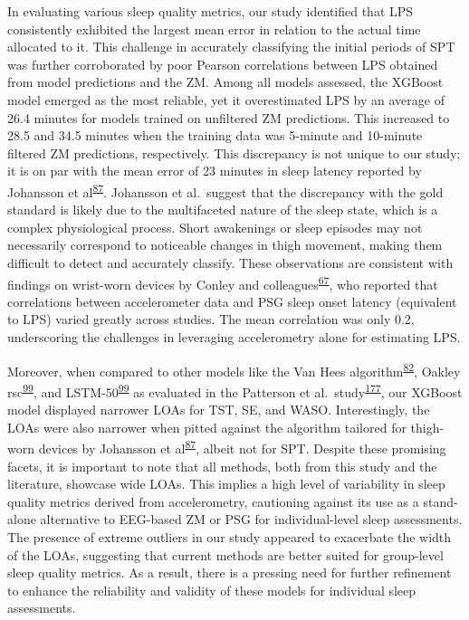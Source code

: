 \documentclass[
  10pt,
]{scrbook}
\begin{document}
In evaluating various sleep quality metrics, our study identified that
LPS consistently exhibited the largest mean error in relation to the
actual time allocated to it. This challenge in accurately classifying
the initial periods of SPT was further corroborated by poor Pearson
correlations between LPS obtained from model predictions and the ZM.
Among all models assessed, the XGBoost model emerged as the most
reliable, yet it overestimated LPS by an average of 26.4 minutes for
models trained on unfiltered ZM predictions. This increased to 28.5 and
34.5 minutes when the training data was 5-minute and 10-minute filtered
ZM predictions, respectively. This discrepancy is not unique to our
study; it is on par with the mean error of 23 minutes in sleep latency
reported by Johansson et
al\textsuperscript{\protect\hyperlink{ref-johansson_development_2023}{87}}.
Johansson et al.~suggest that the discrepancy with the gold standard is
likely due to the multifaceted nature of the sleep state, which is a
complex physiological process. Short awakenings or sleep episodes may
not necessarily correspond to noticeable changes in thigh movement,
making them difficult to detect and accurately classify. These
observations are consistent with findings on wrist-worn devices by
Conley and
colleagues\textsuperscript{\protect\hyperlink{ref-conley_agreement_2019}{67}},
who reported that correlations between accelerometer data and PSG sleep
onset latency (equivalent to LPS) varied greatly across studies. The
mean correlation was only 0.2, underscoring the challenges in leveraging
accelerometry alone for estimating LPS.

Moreover, when compared to other models like the Van Hees
algorithm\textsuperscript{\protect\hyperlink{ref-hees_novel_2015}{82}},
Oakley
rsc\textsuperscript{\protect\hyperlink{ref-palotti_benchmark_2019}{99}},
and
LSTM-50\textsuperscript{\protect\hyperlink{ref-palotti_benchmark_2019}{99}}
as evaluated in the Patterson et
al.~study\textsuperscript{\protect\hyperlink{ref-patterson_40_2023}{177}},
our XGBoost model displayed narrower LOAs for TST, SE, and WASO.
Interestingly, the LOAs were also narrower when pitted against the
algorithm tailored for thigh-worn devices by Johansson et
al\textsuperscript{\protect\hyperlink{ref-johansson_development_2023}{87}},
albeit not for SPT. Despite these promising facets, it is important to
note that all methods, both from this study and the literature, showcase
wide LOAs. This implies a high level of variability in sleep quality
metrics derived from accelerometry, cautioning against its use as a
stand-alone alternative to EEG-based ZM or PSG for individual-level
sleep assessments. The presence of extreme outliers in our study
appeared to exacerbate the width of the LOAs, suggesting that current
methods are better suited for group-level sleep quality metrics. As a
result, there is a pressing need for further refinement to enhance the
reliability and validity of these models for individual sleep
assessments.
\end{document}
